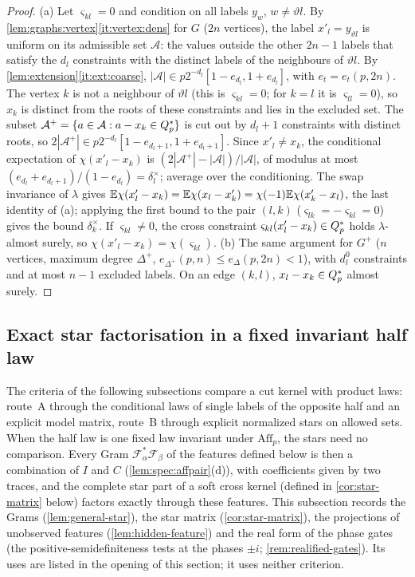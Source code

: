 \begin{proof}
(a) Let $\varsigma_{kl}=0$ and condition on all labels $y_w$, $w\ne\vartheta l$.
By \cref{lem:graphs:vertex}\ref{it:vertex:dens} for $G$ ($2n$ vertices), the
label $x'_l=y_{\vartheta l}$ is uniform on its admissible set $\mathcal A$: the
values outside the other $2n-1$ labels that satisfy the $d_l$ constraints with
the distinct labels of the neighbours of $\vartheta l$. By
\cref{lem:extension}\ref{it:ext:coarse},
$|\mathcal A|\in p2^{-d_l}[1-e_{d_l},1+e_{d_l}]$, with $e_t=e_t(p,2n)$. The vertex $k$
is not a neighbour of $\vartheta l$ (this is $\varsigma_{kl}=0$; for $k=l$ it is
$\varsigma_{ll}=0$), so $x_k$ is distinct from the roots of these constraints
and lies in the excluded set. The subset $\mathcal A^+=\{a\in\mathcal A:a-x_k\in Q_{p}^{*}\}$
is cut out by $d_l+1$ constraints with distinct roots, so
$2|\mathcal A^+|\in p2^{-d_l}[1-e_{d_l+1},1+e_{d_l+1}]$. Since $x'_l\ne x_k$, the
conditional expectation of $\chi(x'_l-x_k)$ is
$(2|\mathcal A^+|-|\mathcal A|)/|\mathcal A|$, of modulus at most
$(e_{d_l}+e_{d_l+1})/(1-e_{d_l})=\delta^\times_l$; average over the conditioning.
The swap invariance of $\lambda$ gives
$\mathbb E\chi(x'_l-x_k)=\mathbb E\chi(x_l-x'_k)=\chi(-1)\mathbb E\chi(x'_k-x_l)$, the last identity of
(a); applying the first bound to the pair $(l,k)$
($\varsigma_{lk}=-\varsigma_{kl}=0$) gives the bound $\delta^\times_k$. If
$\varsigma_{kl}\ne0$, the cross constraint $\varsigma_{kl}(x'_l-x_k)\in Q_{p}^{*}$ holds
$\lambda$-almost surely, so $\chi(x'_l-x_k)=\chi(\varsigma_{kl})$.
(b) The same argument for $G^+$ ($n$ vertices, maximum degree $\Delta^+$,
$e_{\Delta^+}(p,n)\le e_\Delta(p,2n)<1$), with $d^0_l$ constraints and at most $n-1$
excluded labels. On an edge $(k,l)$, $x_l-x_k\in Q_{p}^{*}$ almost surely.
\end{proof}

\subsection{Exact star factorisation in a fixed invariant half law}\label{subsec:spec:actual-stars}

The criteria of the following subsections compare a cut kernel with product
laws: route~A through the conditional laws of single labels of the opposite
half and an explicit model matrix, route~B through explicit normalized stars on
allowed sets. When the half law is one fixed law invariant under
$\mathrm{Aff}_p$, the stars need no comparison. Every Gram $\mathcal F_\alpha^*\mathcal F_\beta$ of the features defined below is then a combination of $I$ and $C$ (\cref{lem:spec:affpair}(d)), with
coefficients given by two traces, and the complete star part of a soft cross kernel (defined in \cref{cor:star-matrix} below) factors exactly through these features. This subsection records the
Grams (\cref{lem:general-star}), the star matrix (\cref{cor:star-matrix}), the
projections of unobserved features (\cref{lem:hidden-feature}) and the real form of the phase gates (the positive-semidefiniteness tests at the phases $\pm i$; \cref{rem:realified-gates}). Its uses are listed in the
opening of this section; it uses neither criterion.

